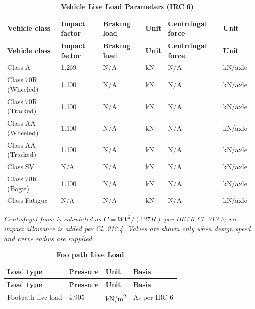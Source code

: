 \documentclass[12pt,a4paper]{report}
\numberwithin{table}{chapter}
\numberwithin{figure}{chapter}
\begin{document}
\vspace{1em}
\begin{longtable}{|L{4.2cm}|C{1.7cm}|C{2.2cm}|C{1.2cm}|C{2.5cm}|C{1.2cm}|}
\caption{\textbf{Vehicle Live Load Parameters (IRC 6)}}
\hline
\textbf{Vehicle class} & \textbf{Impact factor} & \textbf{Braking load} & \textbf{Unit} & \textbf{Centrifugal force} & \textbf{Unit} \\
\hline
\endfirsthead
\textbf{Vehicle class} & \textbf{Impact factor} & \textbf{Braking load} & \textbf{Unit} & \textbf{Centrifugal force} & \textbf{Unit} \\
\hline
\endhead
Class A & 1.269 & N/A & kN & N/A & kN/axle \\[6pt]
\hline
Class 70R (Wheeled) & 1.100 & N/A & kN & N/A & kN/axle \\[6pt]
\hline
Class 70R (Tracked) & 1.100 & N/A & kN & N/A & kN/axle \\[6pt]
\hline
Class AA (Wheeled) & 1.100 & N/A & kN & N/A & kN/axle \\[6pt]
\hline
Class AA (Tracked) & 1.100 & N/A & kN & N/A & kN/axle \\[6pt]
\hline
Class SV & N/A & N/A & kN & N/A & kN/axle \\[6pt]
\hline
Class 70R (Bogie) & 1.100 & N/A & kN & N/A & kN/axle \\[6pt]
\hline
Class Fatigue & N/A & N/A & kN & N/A & kN/axle \\[6pt]
\hline
\end{longtable}
\noindent\textit{Centrifugal force is calculated as $C=WV^2/(127R)$ per IRC 6 Cl. 212.2; no impact allowance is added per Cl. 212.4. Values are shown only when design speed and curve radius are supplied.}

\vspace{0.6em}
\begin{longtable}{|L{5.5cm}|C{2.3cm}|C{3.2cm}|L{3.2cm}|}
\caption{\textbf{Footpath Live Load}}
\hline
\textbf{Load type} & \textbf{Pressure} & \textbf{Unit} & \textbf{Basis} \\
\hline
\endfirsthead
\textbf{Load type} & \textbf{Pressure} & \textbf{Unit} & \textbf{Basis} \\
\hline
\endhead
Footpath live load & 4.905 & kN/m\textsuperscript{2} & As per IRC 6 \\[6pt]
\hline
\end{longtable}
\end{document}
